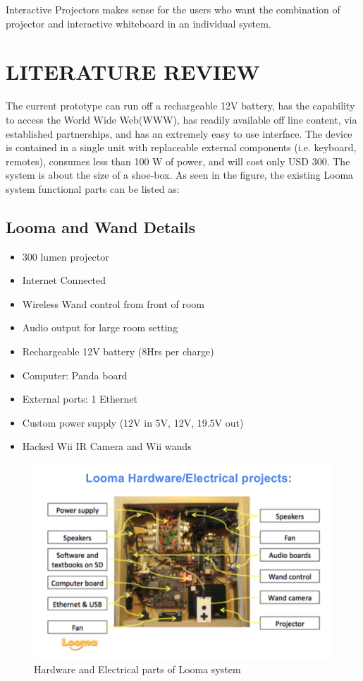 \documentclass[12pt, a4paper]{article}
\begin{document}
Interactive Projectors makes sense for the
users who want the combination of projector and interactive whiteboard in
an individual system. 

\newpage
\section{LITERATURE REVIEW}
The current prototype can run off a rechargeable 12V battery, has the capability to access the World Wide Web(WWW), has readily available off line content, via established partnerships, and has an extremely easy to use interface. The device is contained in a single unit with replaceable external components (i.e. keyboard, remotes), consumes less than 100 W of power, and will cost only USD 300. The system is about the size of a shoe-box. 
As seen in the figure, the existing Looma system functional parts can be listed as:

\subsection{Looma and Wand Details}
\begin{itemize}
\item300 lumen projector
\item Internet Connected 
\item Wireless Wand control from front of room
\item Audio output for large room setting
\item Rechargeable 12V battery (8Hrs per charge)
\item Computer: Panda board
\item External ports: 1 Ethernet
\item Custom power supply (12V in 5V, 12V, 19.5V out)
\item Hacked Wii IR Camera and Wii wands
\end{itemize}

\begin{figure}[h!]
\centering
\includegraphics[scale=0.22]{looma}
\caption {Hardware and Electrical parts of Looma system}
\end{figure}
\end{document}
